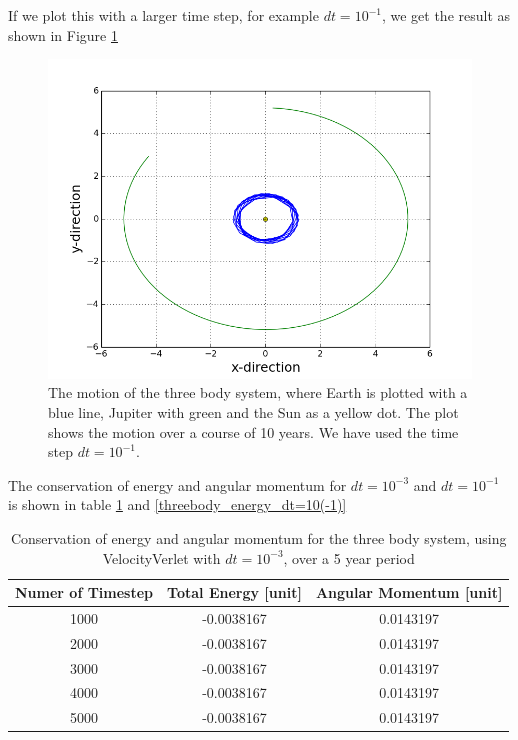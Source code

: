\documentclass[norsk,a4paper,12pt]{article}
\begin{document}
{If we plot this with a larger time step, for example $dt = 10^{-1}$, we get the result as shown in Figure \ref{fig:Jupiter_m=10^(-3)_Earth_dt=10^(-1)}

\begin{figure} [H]
    \centering
    \includegraphics[scale= 0.6] {oppg_3e_threebody_Jupiter_m=10_(-3)_Earth_dt=10(-1)}
    \caption{The motion of the three body system, where Earth is plotted with a blue line, Jupiter with green and the Sun as a yellow dot. The plot shows the motion over a course of 10 years. We have used the time step $dt = 10^{-1}$.}
    \label{fig:Jupiter_m=10^(-3)_Earth_dt=10^(-1)}
\end{figure}

The conservation of energy and angular momentum  for $dt= 10^{-3}$ and $dt = 10^{-1}$ is shown in table \ref{threebody_energy_dt=10(-3)} and \ref{threebody_energy_dt=10(-1)}

\begin{table} [H]
\caption{Conservation of energy and angular momentum for the three body system, using VelocityVerlet with $dt=10^{-3}$, over a 5 year period}
\begin{tabular}{|c|c|c|} \hline
    {\bf Numer of Timestep} & {\bf Total Energy [unit]}& {\bf Angular Momentum [unit]}\\ \hline
    1000 & -0.0038167 & 0.0143197\\ \hline
    2000 & -0.0038167 & 0.0143197\\ \hline
    3000 & -0.0038167 & 0.0143197\\ \hline
    4000 & -0.0038167 & 0.0143197\\ \hline
    5000 & -0.0038167 & 0.0143197\\ \hline 
\end{tabular}
\label{threebody_energy_dt=10(-3)}
\end{table}

}
\end{document}
